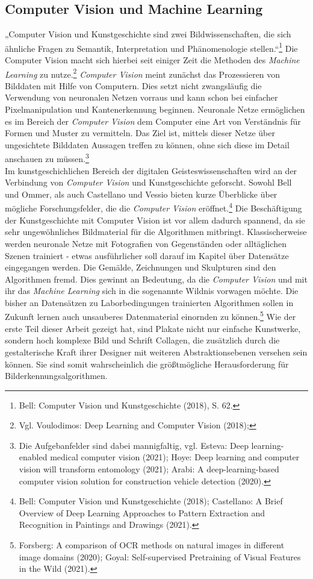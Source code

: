 \documentclass[a4paper,12pt,ngerman]{article}
\begin{document}
\subsection{Computer Vision und Machine Learning}

„Computer Vision und Kunstgeschichte sind zwei Bildwissenschaften, die sich ähnliche Fragen zu Semantik, Interpretation und Phänomenologie stellen.“\footnote{Bell: Computer Vision und Kunstgeschichte (2018), S. 62.} Die Computer Vision macht sich hierbei seit einiger Zeit die Methoden des \textit{Machine Learning} zu nutze.\footnote{Vgl. Voulodimos: Deep Learning and Computer Vision (2018); } \textit{Computer Vision} meint zunächst das Prozessieren von Bilddaten mit Hilfe von Computern. Dies setzt nicht zwangsläufig die Verwendung von neuronalen Netzen vorraus und kann schon bei einfacher Pixelmanipulation und Kantenerkennung beginnen. Neuronale Netze ermöglichen es im Bereich der \textit{Computer Vision} dem Computer eine Art von Verständnis für Formen und Muster zu vermitteln. Das Ziel ist, mittels dieser Netze über ungesichtete Bilddaten Aussagen treffen zu können, ohne sich diese im Detail anschauen zu müssen.\footnote{Die Aufgebanfelder sind dabei mannigfaltig, vgl. Esteva: Deep learning-enabled medical computer vision (2021); Hoye: Deep learning and computer vision will transform entomology (2021); Arabi: A deep-learning-based computer vision solution for construction vehicle detection (2020).} \\
Im kunstgeschichlichen Bereich der digitalen Geisteswissenschaften wird an der Verbindung von \textit{Computer Vision} und Kunstgeschichte geforscht. Sowohl Bell und Ommer, als auch Castellano und Vessio bieten kurze Überblicke über mögliche Forschungsfelder, die die \textit{Computer Vision} eröffnet.\footnote{Bell: Computer Vision und Kunstgeschichte (2018); Castellano: A Brief Overview of Deep Learning Approaches to Pattern Extraction and Recognition in Paintings and Drawings (2021).} Die Beschäftigung der Kunstgeschichte mit Computer Vision ist vor allem dadurch spannend, da sie sehr ungewöhnliches Bildmaterial für die Algorithmen mitbringt. Klassischerweise werden neuronale Netze mit Fotografien von Gegenständen oder alltäglichen Szenen trainiert - etwas ausführlicher soll darauf im Kapitel über Datensätze eingegangen werden. Die Gemälde, Zeichnungen und Skulpturen sind den Algorithmen fremd. Dies gewinnt an Bedeutung, da die \textit{Computer Vision} und mit ihr das \textit{Machine Learning} sich in die sogenannte Wildnis vorwagen möchte. Die bisher an Datensätzen zu Laborbedingungen trainierten Algorithmen sollen in Zukunft lernen auch unsauberes Datenmaterial einornden zu können.\footnote{Forsberg: A comparison of OCR methods on natural images in different image domains (2020); Goyal: Self-supervised Pretraining of Visual Features in the Wild (2021).} Wie der erste Teil dieser Arbeit gezeigt hat, sind Plakate nicht nur einfache Kunstwerke, sondern hoch komplexe Bild und Schrift Collagen, die zusätzlich durch die gestalterische Kraft ihrer Designer mit weiteren Abstraktionsebenen versehen sein können. Sie sind somit wahrscheinlich die größtmögliche Herausforderung für Bilderkennungsalgorithmen. \\
\end{document}

